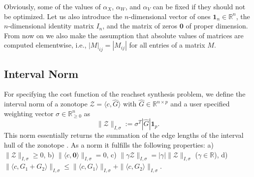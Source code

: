 \documentclass[EPiC]{easychair}
\renewcommand{\^}[1]{^{(#1)}}
\begin{document}
Obviously, some of the values of $\alpha_X$, $\alpha_W$, and $\alpha_V$ can be fixed if they should not be optimized. Let us also introduce the $n$-dimensional vector of ones $\mathbf{1}_n \in \mathbb{R}^n$, the $n$-dimensional identity matrix $I_n$, and the matrix of zeros $\mathbf{0}$ of proper dimension. From now on we also make the assumption that absolute values of matrices are computed elementwise, i.e., $|M|_{ij} = |M_{ij}|$ for all entries of a matrix $M$. 

\subsection{Interval Norm}

For specifying the cost function of the reachset synthesis problem, we define the interval norm of a zonotope $\mathcal{Z}=\langle c, \hat{G} \rangle$ with $\hat{G} \in \mathbb{R}^{n \times p}$ and a user specified weighting vector $\sigma \in \mathbb{R}^n_{\geq 0}$ as
	\begin{equation} \label{eq:intervalNorm}
		\|\mathcal{Z}\|_{I,\sigma} := \sigma^T |\hat{G}| \mathbf{1}_p.
	\end{equation}
This norm essentially returns the summation of the edge lengths of the interval hull of the zonotope \cite[Prop.~2.2]{Althoff2010a}. As a norm it fulfills the following properties: a) $\|\mathcal{Z}\|_{I,\sigma} \geq 0$, b) $\|\langle c, \mathbf{0} \rangle \|_{I,\sigma} = 0$, c) $\| \gamma \mathcal{Z} \|_{I,\sigma} =  |\gamma| \| \mathcal{Z} \|_{I,\sigma}$ ($\gamma \in \mathbb{R}$), d) $\| \langle c, G_1 + G_2 \rangle\|_{I,\sigma} \leq  \| \langle c, G_1 \rangle \|_{I,\sigma} + \| \langle c, G_2 \rangle \|_{I,\sigma}$.
\end{document}
